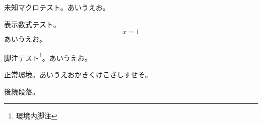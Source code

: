 \documentclass[pdflatex]{jlreq}
\begin{document}
\begin{ptjparagraph}
未知マクロテスト。\thismacroisundefined あいうえお。
\end{ptjparagraph}
\begin{ptjparagraph}
表示数式テスト。
\[ x=1 \]
あいうえお。
\end{ptjparagraph}
\begin{ptjparagraph}
脚注テスト\footnote{環境内脚注}。あいうえお。
\end{ptjparagraph}
\begin{ptjparagraph}
正常環境。あいうえおかきくけこさしすせそ。
\end{ptjparagraph}
後続段落。
\end{document}
